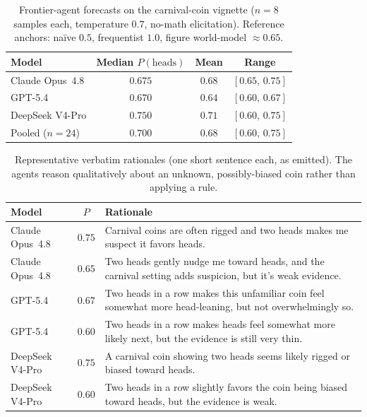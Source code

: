 \documentclass{article} %
\begin{document}
\begin{table}[h]
\centering
\caption{Frontier-agent forecasts on the carnival-coin vignette ($n{=}8$ samples each, temperature
$0.7$, no-math elicitation).  Reference anchors: na\"ive $0.5$, frequentist $1.0$, figure
world-model $\approx0.65$.}
\label{tab:carnival}
\small
\begin{tabular}{l c c c}
\toprule
Model & Median $P(\text{heads})$ & Mean & Range \\
\midrule
Claude Opus~4.8  & $0.675$ & $0.68$ & $[0.65,\,0.75]$ \\
GPT-5.4          & $0.670$ & $0.64$ & $[0.60,\,0.67]$ \\
DeepSeek V4-Pro  & $0.750$ & $0.71$ & $[0.60,\,0.75]$ \\
\midrule
Pooled ($n{=}24$) & $0.700$ & $0.68$ & $[0.60,\,0.75]$ \\
\bottomrule
\end{tabular}
\end{table}

\begin{table}[h]
\centering
\caption{Representative verbatim rationales (one short sentence each, as emitted).  The agents reason
qualitatively about an unknown, possibly-biased coin rather than applying a rule.}
\label{tab:carnival-samples}
\small
\begin{tabular}{l c p{8.3cm}}
\toprule
Model & $P$ & Rationale \\
\midrule
Claude Opus~4.8 & $0.75$ & Carnival coins are often rigged and two heads makes me suspect it favors heads. \\
Claude Opus~4.8 & $0.65$ & Two heads gently nudge me toward heads, and the carnival setting adds suspicion, but it's weak evidence. \\
GPT-5.4         & $0.67$ & Two heads in a row makes this unfamiliar coin feel somewhat more head-leaning, but not overwhelmingly so. \\
GPT-5.4         & $0.60$ & Two heads in a row makes heads feel somewhat more likely next, but the evidence is still very thin. \\
DeepSeek V4-Pro & $0.75$ & A carnival coin showing two heads seems likely rigged or biased toward heads. \\
DeepSeek V4-Pro & $0.60$ & Two heads in a row slightly favors the coin being biased toward heads, but the evidence is weak. \\
\bottomrule
\end{tabular}
\end{table}
\end{document}
